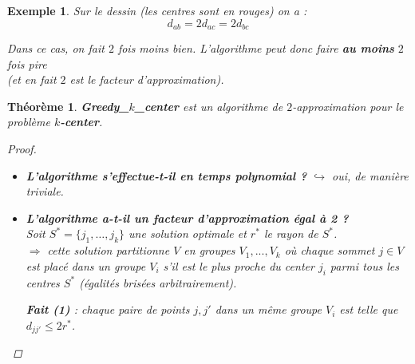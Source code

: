 \documentclass{article}
\newtheorem{exemple}{Exemple}[section]
\newtheorem{thm}{Th\'eor\`eme}[section]
\newtheorem{proof}{Preuve}[section]
\begin{document}
\begin{sffamily}
\begin{exemple}
Sur le dessin \textit{(les centres sont en rouges)} on a : $$d_{ab} = 2 d_{ac} = 2 d_{bc} $$

Dans ce cas, on fait $2$ fois moins bien. L'algorithme peut donc faire \textbf{au moins} $2$ fois pire\\\indent (et en fait $2$ est
le facteur d'approximation).
\end{exemple}

\newpage

\begin{thm} \textbf{Greedy\_$k$\_center} est un algorithme de $2$-approximation pour le problème \textbf{$k$-center}.
\begin{proof}$ $\\
\begin{itemize}
\item \textbf{L'algorithme s'effectue-t-il en temps polynomial ?} $\hookrightarrow$ oui, de manière triviale.
\item \textbf{L'algorithme a-t-il un facteur d'approximation égal à 2 ?} \\
Soit $S^* = \{j_1,\ldots ,j_k\}$ une solution optimale et $r^*$ le rayon de $S^*$.\\
$\Rightarrow$ cette solution partitionne $V$ en groupes $V_1,...,V_k$ où chaque sommet $j\in V$ est placé dans un groupe $V_i$ s'il est
le plus proche du center $j_i$ parmi tous les centres $S^*$ (égalités brisées arbitrairement). \\
\begin{center}
	\textbf{Fait (1)} : chaque paire de points $j,j'$ dans un même groupe $V_i$ est telle que $d_{jj'} \leq 2r^*$.\\
\end{center}


\end{itemize}
\end{proof}
\end{thm}
\end{sffamily}
\end{document}

